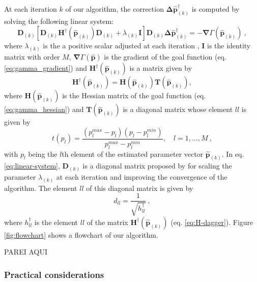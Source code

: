 At each iteration $k$ of our algorithm, the correction $\boldsymbol{\Delta}\hat{\mathbf{p}}^{\dagger}_{(k)}$
is computed by solving the following linear system:
\begin{equation}\label{eq:linear-system}
\mathbf{D}_{(k)} \left[\mathbf{D}_{(k)} \mathbf{H}^{\dagger}(\hat{\mathbf{p}}_{(k)}) \mathbf{D}_{(k)} + \lambda_{(k)} \mathbf{I}\right] \mathbf{D}_{(k)} \boldsymbol{\Delta} \hat{\mathbf{p}}^{\dagger}_{(k)} = -\boldsymbol{\nabla}\Gamma(\hat{\mathbf{p}}_{(k)}) \: ,
\end{equation}
where $\lambda_{(k)}$ is the a positive scalar adjusted at each iteration \cite[e.g., ][ p. 240]{aster-etal2019}, 
$\mathbf{I}$ is the identity matrix with order $M$, $\boldsymbol{\nabla}\Gamma(\hat{\mathbf{p}})$ is the gradient of the 
goal function (eq. \ref{eq:gamma_gradient}) and $\mathbf{H}^{\dagger}(\hat{\mathbf{p}}_{(k)})$ is a matrix given by
\begin{equation}\label{eq:H-dagger}
\mathbf{H}^{\dagger}(\hat{\mathbf{p}}_{(k)}) = \mathbf{H}(\hat{\mathbf{p}}_{(k)})\mathbf{T}(\hat{\mathbf{p}}_{(k)}),
\end{equation}
where $\mathbf{H}(\hat{\mathbf{p}}_{(k)})$ is the Hessian matrix of the goal function (eq. \ref{eq:gamma_hessian}) 
and $\mathbf{T}(\hat{\mathbf{p}}_{(k)})$ is a diagonal matrix whose element $ll$ is given by
\begin{equation}\label{eq:inequality-diag}
t(p_{l}) = \frac{(p_{l}^{max} - p_{l})(p_{l} - p_{l}^{min})}{p_{l}^{max} - p_{l}^{min}}, \quad l = 1, \dots, M \: ,
\end{equation}
with $p_{l}$ being the $l$th element of the estimated parameter vector $\hat{\mathbf{p}}_{(k)}$. 
In eq. \ref{eq:linear-system}, $\mathbf{D}_{(k)}$ is a diagonal matrix proposed by 
\cite{marquardt_algorithm_1963} for scaling the parameter $\lambda_{(k)}$ at each iteration and 
improving the convergence of the algorithm. The element $ll$ of this diagonal matrix is given by
\begin{equation}\label{eq:D-matrix}
d_{ll} = \frac{1}{\sqrt{h^{\dagger}_{ll}}} \: ,
\end{equation}
where $h^{\dagger}_{ll}$ is the element $ll$ of the matrix $\mathbf{H}^{\dagger}(\hat{\mathbf{p}}_{(k)})$ 
(eq. \ref{eq:H-dagger}). Figure \ref{fig:flowchart} shows a flowchart of our algorithm.

PAREI AQUI

\subsubsection{Practical considerations}

